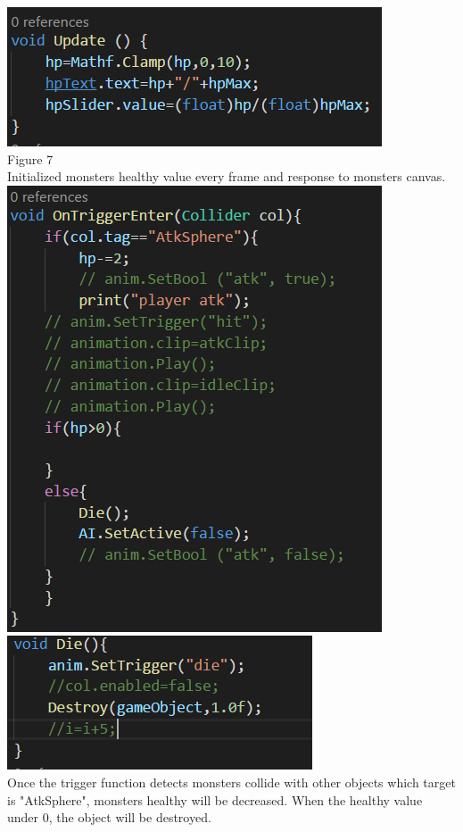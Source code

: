 \begin{itemize}
\includegraphics[scale=0.5]{img/MonsterLP.png}\\{Figure 7}\\
Initialized monsters healthy value every frame and response to monsters canvas.\\

\includegraphics[scale=0.5]{img/MonsterTrigger1.png}
\includegraphics[scale=0.5]{img/MonsterTrigger2.png}\\
Once the trigger function detects monsters collide with other objects which target is "AtkSphere",  monsters healthy will be decreased. When the healthy value under 0, the object will be destroyed.\\


\end{itemize}
